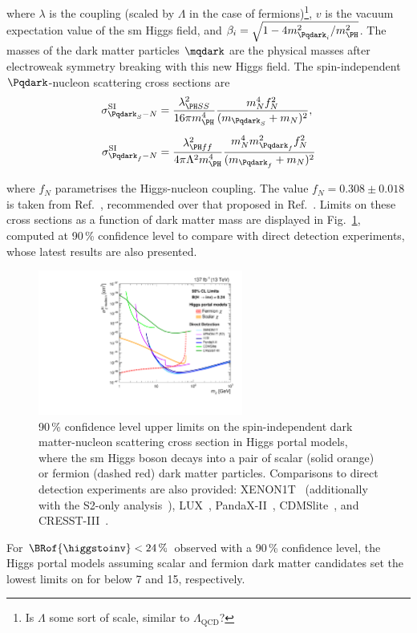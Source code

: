 where $\lambda$ is the coupling (scaled by $\Lambda$ in the case of fermions)\footnote{Is $\Lambda$ some sort of scale, similar to $\Lambda_{\mathrm{QCD}}$?}, $v$ is the vacuum expectation value of the \acrshort{sm} Higgs field, and $\beta_i = \sqrt{1 - 4m_{\Pqdark_i}^2/m_{\PH}^2}$. The masses of the dark matter particles $\mqdark$ are the physical masses after electroweak symmetry breaking with this new Higgs field. The spin-independent $\Pqdark$-nucleon scattering cross sections are
\begin{equation}
    \begin{aligned}
\sigma^{\mathrm{SI}}_{\Pqdark_{S}-N} &= \frac{\lambda^2_{\PH SS} }{ 16 \pi m_{\PH}^4} \frac{ m_N^4 f_N^2 }{ (m_{\Pqdark_{S}} + m_N)^2 },\\[0.5em]
\sigma^{\mathrm{SI}}_{\Pqdark_{f}-N} &= \frac{\lambda^2_{\PH ff} }{ 4 \pi \Lambda^2 m_{\PH}^4} \frac{ m_N^4 m_{\Pqdark_{f}}^2 f_N^2 }{ (m_{\Pqdark_{f}} + m_N)^2 }
    \end{aligned}
\end{equation}

where $f_N$ parametrises the Higgs-nucleon coupling. The value $f_N = \text{0.308} \pm \text{0.018}$ is taken from Ref.~, recommended over that proposed in Ref.~. Limits on these cross sections as a function of dark matter mass are displayed in Fig.~\ref{fig:higgs_portal_dm_limits}, computed at 90\,\% confidence level to compare with direct detection experiments, whose latest results are also presented.

\begin{figure}
    \centering
    \includegraphics[width=0.6\textwidth]{figures/dark_matter_limit/higgsPortalDM.pdf}
    \caption[90\,\% confidence level upper limits on the spin-independent dark matter-nucleon scattering cross section in Higgs portal models, where the standard model Higgs boson decays into a pair of scalar (solid orange) or fermion (dashed red) dark matter particles]{90\,\% confidence level upper limits on the spin-independent dark matter-nucleon scattering cross section in Higgs portal models, where the \acrlong{sm} Higgs boson decays into a pair of scalar (solid orange) or fermion (dashed red) dark matter particles. Comparisons to direct detection experiments are also provided: XENON1T~\cite{Aprile:2018dbl} (additionally with the S2-only analysis~\cite{Aprile:2019xxb}), LUX~\cite{Akerib:2016vxi}, PandaX-II~\cite{Cui:2017nnn}, CDMSlite~\cite{Agnese:2018gze}, and CRESST-III~\cite{Abdelhameed:2019hmk}.}
    \label{fig:higgs_portal_dm_limits}
\end{figure}

For $\BRof{\higgstoinv} < \text{24\,\%}$ observed with a 90\,\% confidence level, the Higgs portal models assuming scalar and fermion dark matter candidates set the lowest limits on \xsecSI for \mqdark below 7 and 15\GeV, respectively.
